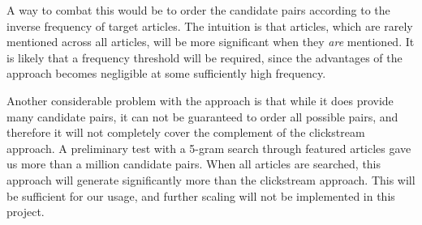 A way to combat this would be to order the candidate pairs according to the inverse frequency of target articles. The intuition is that articles, which are rarely mentioned across all articles, will be more significant when they \emph{are} mentioned. It is likely that a frequency threshold will be required, since the advantages of the approach becomes negligible at some sufficiently high frequency.

Another considerable problem with the approach is that while it does provide many candidate pairs, it can not be guaranteed to order all possible pairs, and therefore it will not completely cover the complement of the clickstream approach. A preliminary test with a 5-gram search through featured articles gave us more than a million candidate pairs. When all articles are searched, this approach will generate significantly more than the clickstream approach. This will be sufficient for our usage, and further scaling will not be implemented in this project.






